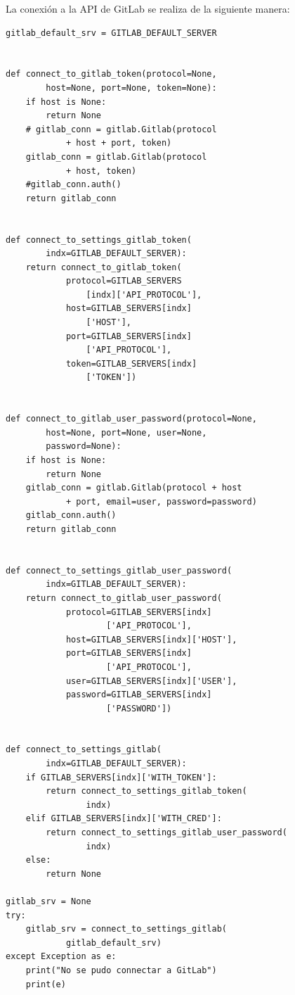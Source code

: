 La conexión a la API de GitLab se realiza de la siguiente manera:
\lstset{language=Python}
\begin{lstlisting}
gitlab_default_srv = GITLAB_DEFAULT_SERVER


def connect_to_gitlab_token(protocol=None,
        host=None, port=None, token=None):
    if host is None:
        return None
    # gitlab_conn = gitlab.Gitlab(protocol
            + host + port, token)
    gitlab_conn = gitlab.Gitlab(protocol
            + host, token)
    #gitlab_conn.auth()
    return gitlab_conn


def connect_to_settings_gitlab_token(
        indx=GITLAB_DEFAULT_SERVER):
    return connect_to_gitlab_token(
            protocol=GITLAB_SERVERS
                [indx]['API_PROTOCOL'],
            host=GITLAB_SERVERS[indx]
                ['HOST'],
            port=GITLAB_SERVERS[indx]
                ['API_PROTOCOL'],
            token=GITLAB_SERVERS[indx]
                ['TOKEN'])


def connect_to_gitlab_user_password(protocol=None,
        host=None, port=None, user=None,
        password=None):
    if host is None:
        return None
    gitlab_conn = gitlab.Gitlab(protocol + host
            + port, email=user, password=password)
    gitlab_conn.auth()
    return gitlab_conn


def connect_to_settings_gitlab_user_password(
        indx=GITLAB_DEFAULT_SERVER):
    return connect_to_gitlab_user_password(
            protocol=GITLAB_SERVERS[indx]
                    ['API_PROTOCOL'],
            host=GITLAB_SERVERS[indx]['HOST'],
            port=GITLAB_SERVERS[indx]
                    ['API_PROTOCOL'],
            user=GITLAB_SERVERS[indx]['USER'],
            password=GITLAB_SERVERS[indx]
                    ['PASSWORD'])


def connect_to_settings_gitlab(
        indx=GITLAB_DEFAULT_SERVER):
    if GITLAB_SERVERS[indx]['WITH_TOKEN']:
        return connect_to_settings_gitlab_token(
                indx)
    elif GITLAB_SERVERS[indx]['WITH_CRED']:
        return connect_to_settings_gitlab_user_password(
                indx)
    else:
        return None

gitlab_srv = None
try:
    gitlab_srv = connect_to_settings_gitlab(
            gitlab_default_srv)
except Exception as e:
    print("No se pudo connectar a GitLab")
    print(e)
\end{lstlisting}
\lstset{language=Bash}


